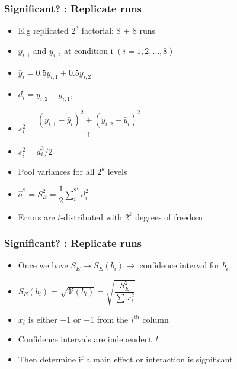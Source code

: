 \begin{frame}\frametitle{Significant? : Replicate runs}
	\begin{itemize}
		\item	E.g replicated $2^3$ factorial: 8 + 8 runs
		\item	$y_{i,1}$ and $y_{i,2}$ at condition i $(i=1, 2, \ldots, 8)$
		\item	$\bar{y}_i = 0.5y_{i,1} + 0.5y_{i,2}$
		\item	$d_i = y_{i,2} - y_{i,1}$,
		\item	$s_i^2 = \dfrac{(y_{i,1} - \bar{y}_i)^2 + (y_{i,2} - \bar{y}_i)^2}{1}$
		\item	$s_i^2 = d_i^2/2$
		\item	Pool variances for all $2^k$ levels
		\item	$\hat{\sigma}^2 = S_E^2 = \dfrac{1}{2}\displaystyle\sum_i^{2^k}{d_i^2}$
		\item	Errors are $t$-distributed with $2^k$ degrees of freedom
	\end{itemize}
\end{frame}

\begin{frame}\frametitle{Significant? : Replicate runs}
	\begin{itemize}
		\item	Once we have $S_E \rightarrow S_E(b_i) \rightarrow$ confidence interval for $b_i$
		\item	$S_E(b_i) = \sqrt{\mathcal{V}\left(b_i\right)} = \sqrt{\dfrac{S_E^2}{\sum{x_i^2}}}$
		\item	$x_i$ is either $-1$ or $+1$ from the $i^\text{th}$ column
		\item	Confidence intervals are independent \emph{!}
		\item	Then determine if a main effect or interaction is significant
	\end{itemize}
	\vspace{12pt}
	{\color{myOrange}{So how do we get degrees of freedom to calculate \( S_E \)?}}
\end{frame}

